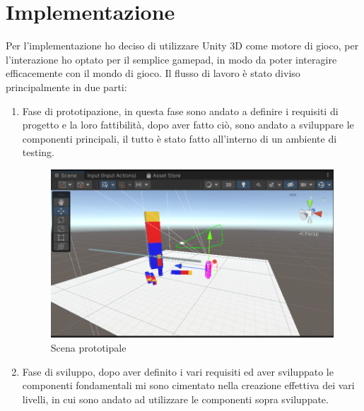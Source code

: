 \documentclass[
a4paper,
cleardoublepage=empty,
headings=twolinechapter,
numbers=autoenddot,
]{scrbook}
\begin{document}
    \section{Implementazione}
    Per l'implementazione ho deciso di utilizzare Unity 3D come motore di gioco, per l'interazione ho optato per il semplice gamepad, in modo da poter interagire efficacemente con il mondo di gioco.
    Il flusso di lavoro è stato diviso principalmente in due parti:
    \begin{enumerate}
        \item Fase di prototipazione, in questa fase sono andato a definire i requisiti di progetto e la loro fattibilità, dopo aver fatto ciò, sono andato a sviluppare le componenti principali, il tutto è stato fatto all'interno di un ambiente di testing.
        \begin{figure}[H]
        	\centering
        	\includegraphics[width=0.8\linewidth]{image/protot}
        	\caption{Scena prototipale}
        	\label{fig:protot}
        \end{figure}
        \item Fase di sviluppo, dopo aver definito i vari requisiti ed aver sviluppato le componenti fondamentali mi sono cimentato nella creazione effettiva dei vari livelli, in cui sono andato ad utilizzare le componenti sopra sviluppate.
    \end{enumerate}
\end{document}
